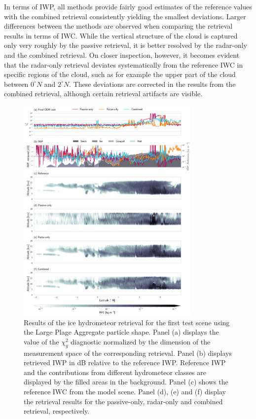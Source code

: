 \documentclass[journal abbreviation, manuscript]{copernicus}
\begin{document}
In terms of IWP, all methods provide fairly good estimates of the reference
values with the combined retrieval consistently yielding the smallest deviations.
Larger differences between the methods are observed when comparing the retrieval
results in terms of IWC. While the vertical structure of the cloud is captured
only very roughly by the passive retrieval, it is better resolved by the
radar-only and the combined retrieval. On closer inspection, however, it becomes
evident that the radar-only retrieval deviates systematically from the reference
IWC in specific regions of the cloud, such as for example the upper part of the
cloud between $0^\circ N$ and $2^\circ N$. These deviations are corrected in the
results from the combined retrieval, although certain retrieval artifacts are
visible.

\begin{figure}
\centering
\includegraphics[width = 0.8\textwidth]{../plots/results_a_LargePlateAggregate}
\caption{Results of the ice hydrometeor retrieval for the first test scene using
  the Large Plage Aggregate particle shape. Panel (a) displays the value of the
  $\chi^2_y$ diagnostic normalized by the dimension of the measurement space of
  the corresponding retrieval. Panel (b) displays retrieved IWP in dB relative
  to the reference IWP. Reference IWP and the contributions from different
  hydrometeor classes are displayed by the filled areas in the background. Panel
  (c) shows the reference IWC from the model scene. Panel (d), (e) and (f)
  display the retrieval results for the passive-only, radar-only and combined
  retrieval, respectively.}
\label{fig:results_a}
\end{figure}
\end{document}
